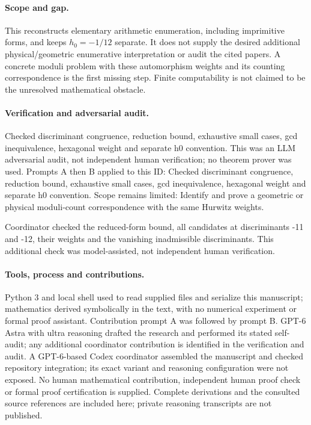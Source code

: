 \documentclass[11pt]{article}
\begin{document}
\paragraph{Scope and gap.}This reconstructs elementary arithmetic enumeration, including imprimitive forms, and keeps \(h_0=-1/12\) separate. It does not supply the desired additional physical/geometric enumerative interpretation or audit the cited papers. A concrete moduli problem with these automorphism weights and its counting correspondence is the first missing step. Finite computability is not claimed to be the unresolved mathematical obstacle.

\paragraph{Verification and adversarial audit.}
Checked discriminant congruence, reduction bound, exhaustive small cases, gcd inequivalence, hexagonal weight and separate h0 convention. This was an LLM adversarial audit, not independent human verification; no theorem prover was used. Prompts A then B applied to this ID: Checked discriminant congruence, reduction bound, exhaustive small cases, gcd inequivalence, hexagonal weight and separate h0 convention. Scope remains limited: Identify and prove a geometric or physical moduli-count correspondence with the same Hurwitz weights.

Coordinator checked the reduced-form bound, all candidates at discriminants -11 and -12, their weights and the vanishing inadmissible discriminants. This additional check was model-assisted, not independent human verification.

\paragraph{Tools, process and contributions.}
Python 3 and local shell used to read supplied files and serialize this manuscript; mathematics derived symbolically in the text, with no numerical experiment or formal proof assistant. Contribution prompt A was followed by prompt B. GPT-6 Astra with ultra reasoning drafted the research and performed its stated self-audit; any additional coordinator contribution is identified in the verification and audit. A GPT-6-based Codex coordinator assembled the manuscript and checked repository integration; its exact variant and reasoning configuration were not exposed. No human mathematical contribution, independent human proof check or formal proof certification is supplied. Complete derivations and the consulted source references are included here; private reasoning transcripts are not published.
\end{document}
